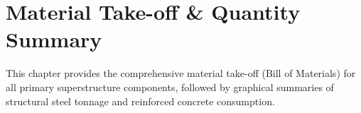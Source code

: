 \documentclass[12pt,a4paper]{report}
\numberwithin{table}{chapter}
\numberwithin{figure}{chapter}
\begin{document}
\noindent
\begin{minipage}[t]{0.31\textwidth}
\centering
{}
\label{fig:ed-bracing-sec}
\end{minipage}
\hfill
\begin{minipage}[t]{0.31\textwidth}
\centering
{}
\label{fig:ed-top-chord}
\end{minipage}
\hfill
\begin{minipage}[t]{0.31\textwidth}
\centering
{}
\label{fig:ed-bottom-chord}
\end{minipage}



\chapter{Material Take-off \& Quantity Summary}
\label{ch:material-takeoff}

This chapter provides the comprehensive material take-off (Bill of Materials) for all primary superstructure components, followed by graphical summaries of structural steel tonnage and reinforced concrete consumption.
\end{document}
